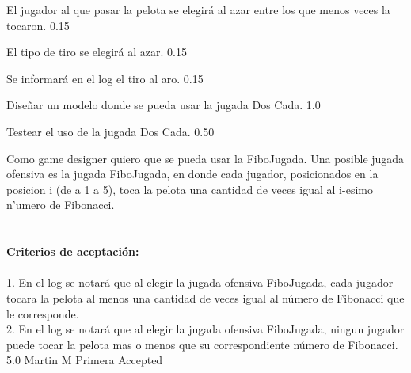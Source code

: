 		{El jugador al que pasar la pelota se elegirá al azar entre los que menos veces la tocaron.} %
		{} %
		{0.15} %
		{} %
		{} %
		{} %

		{El tipo de tiro se elegirá al azar.} %
		{} %
		{0.15} %
		{} %
		{} %
		{} %
		
		{Se informará en el log el tiro al aro.} %
		{} %
		{0.15} %
		{} %
		{} %
		{} %

		{Diseñar un modelo donde se pueda usar la jugada Dos Cada.} %
		{} %
		{1.0} %
		{} %
		{} %
		{} %


		{Testear el uso de la jugada Dos Cada.} %
		{} %
		{0.50} %
		{} %
		{} %
		{} %

\vspace{20pt}

	{Como game designer quiero que se pueda usar la FiboJugada.} %
	{Una posible jugada ofensiva es la jugada FiboJugada, en donde cada jugador, posicionados en la posicion i (de a 1 a 5), toca la pelota una cantidad de veces igual al i-esimo n'umero de Fibonacci. \\
  \\
  \\
\textbf{Criterios de aceptación:}\\
  \\
1. En el log se notará que al elegir la jugada ofensiva FiboJugada, cada jugador tocara la pelota al menos una cantidad de veces igual al número de Fibonacci que le corresponde. \\
2. En el log se notará que al elegir la jugada ofensiva FiboJugada, ningun jugador puede tocar la pelota mas o menos que su correspondiente número de Fibonacci. \\
} %
	{} %
	{5.0} %
	{Martin M} %
	{Primera} %
	{Accepted} %

